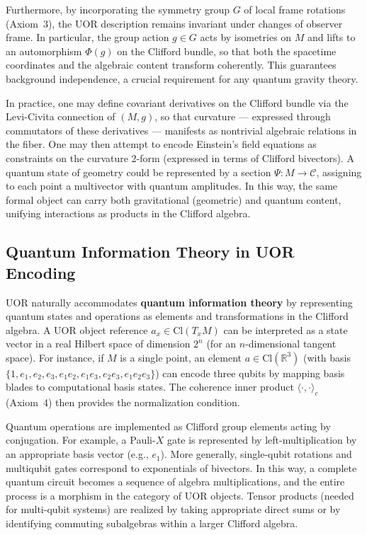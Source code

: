 \documentclass[12pt]{article}
\begin{document}
Furthermore, by incorporating the symmetry group $G$ of local frame rotations (Axiom~3), the UOR description remains invariant under changes of observer frame. In particular, the group action $g \in G$ acts by isometries on $M$ and lifts to an automorphism $\Phi(g)$ on the Clifford bundle, so that both the spacetime coordinates and the algebraic content transform coherently. This guarantees background independence, a crucial requirement for any quantum gravity theory.

In practice, one may define covariant derivatives on the Clifford bundle via the Levi-Civita connection of $(M,g)$, so that curvature --- expressed through commutators of these derivatives --- manifests as nontrivial algebraic relations in the fiber. One may then attempt to encode Einstein's field equations as constraints on the curvature 2-form (expressed in terms of Clifford bivectors). A quantum state of geometry could be represented by a section $\Psi : M \to \mathcal{C}$, assigning to each point a multivector with quantum amplitudes. In this way, the same formal object can carry both gravitational (geometric) and quantum content, unifying interactions as products in the Clifford algebra.

\subsection{Quantum Information Theory in UOR Encoding}
UOR naturally accommodates \textbf{quantum information theory} by representing quantum states and operations as elements and transformations in the Clifford algebra. A UOR object reference $a_x \in \mathrm{Cl}(T_x M)$ can be interpreted as a state vector in a real Hilbert space of dimension $2^n$ (for an $n$-dimensional tangent space). For instance, if $M$ is a single point, an element $a \in \mathrm{Cl}(\mathbb{R}^3)$ (with basis $\{1, e_1, e_2, e_3, e_1e_2, e_1e_3, e_2e_3, e_1e_2e_3\}$) can encode three qubits by mapping basis blades to computational basis states. The coherence inner product $\langle \cdot, \cdot \rangle_c$ (Axiom~4) then provides the normalization condition.

Quantum operations are implemented as Clifford group elements acting by conjugation. For example, a Pauli-$X$ gate is represented by left-multiplication by an appropriate basis vector (e.g., $e_1$). More generally, single-qubit rotations and multiqubit gates correspond to exponentials of bivectors. In this way, a complete quantum circuit becomes a sequence of algebra multiplications, and the entire process is a morphism in the category of UOR objects. Tensor products (needed for multi-qubit systems) are realized by taking appropriate direct sums or by identifying commuting subalgebras within a larger Clifford algebra.
\end{document}
